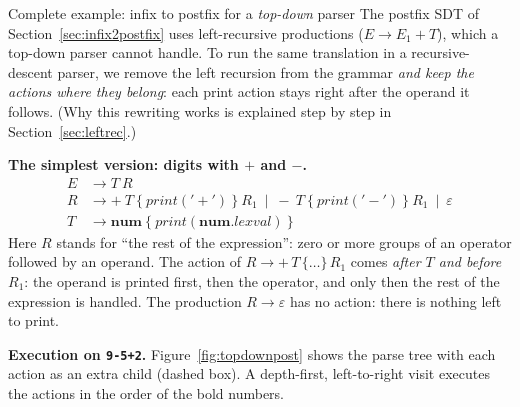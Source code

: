 \documentclass[11pt,a4paper]{article}
\newcommand{\at}[2]{\ensuremath{#1.\mathit{#2}}}
\newcommand{\tok}[1]{\ensuremath{\mathtt{#1}}}
\begin{document}
\begin{examplebox}{Complete example: infix to postfix for a \emph{top-down} parser}
The postfix SDT of Section~\ref{sec:infix2postfix} uses left-recursive productions ($E\to E_1+T$), which a top-down parser cannot handle. To run the same translation in a recursive-descent parser, we remove the left recursion from the grammar \emph{and keep the actions where they belong}: each print action stays right after the operand it follows. (Why this rewriting works is explained step by step in Section~\ref{sec:leftrec}.)

\textbf{The simplest version: digits with $+$ and $-$.}
\begin{align*}
E &\to T\ R\\
R &\to +\ T\ \{\ \mathit{print}(\tok{'+'})\ \}\ R_1 \ \mid\ -\ T\ \{\ \mathit{print}(\tok{'-'})\ \}\ R_1 \ \mid\ \varepsilon\\
T &\to \mathbf{num}\ \{\ \mathit{print}(\at{\mathbf{num}}{lexval})\ \}
\end{align*}
Here $R$ stands for ``the rest of the expression'': zero or more groups of an operator followed by an operand. The action of $R\to+\,T\,\{\dots\}\,R_1$ comes \emph{after $T$ and before $R_1$}: the operand is printed first, then the operator, and only then the rest of the expression is handled. The production $R\to\varepsilon$ has no action: there is nothing left to print.

\textbf{Execution on \texttt{9-5+2}.} Figure~\ref{fig:topdownpost} shows the parse tree with each action as an extra child (dashed box). A depth-first, left-to-right visit executes the actions in the order of the bold numbers.


\end{examplebox}
\end{document}
